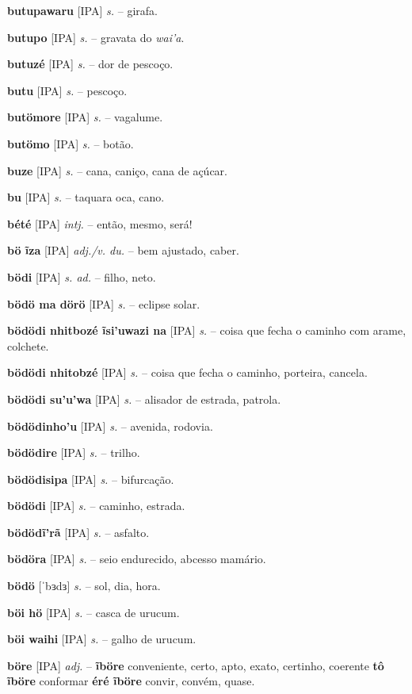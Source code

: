 \textbf{butupawaru} [IPA] \textit{s.} -- girafa.

\textbf{butupo} [IPA] \textit{s.} -- gravata do \textit{wai'a}.

\textbf{butuzé} [IPA] \textit{s.} -- dor de pescoço.

\textbf{butu} [IPA] \textit{s.} -- pescoço.

\textbf{butömore} [IPA] \textit{s.} -- vagalume.

\textbf{butömo} [IPA] \textit{s.} -- botão.

\textbf{buze} [IPA] \textit{s.} -- cana, caniço, cana de açúcar.

\textbf{bu} [IPA] \textit{s.} -- taquara oca, cano.

\textbf{bété} [IPA] \textit{intj.} -- então, mesmo, será!

\textbf{bö ĩza} [IPA] \textit{adj./v. du.} -- bem ajustado, caber.

\textbf{bödi} [IPA] \textit{s. ad.} -- filho, neto.

\textbf{bödö ma dörö} [IPA] \textit{s.} -- eclipse solar.

\textbf{bödödi nhitbozé ĩsi'uwazi na} [IPA] \textit{s.} -- coisa que fecha o caminho com arame, colchete.

\textbf{bödödi nhitobzé} [IPA] \textit{s.} -- coisa que fecha o caminho, porteira, cancela.

\textbf{bödödi su'u'wa} [IPA] \textit{s.} -- alisador de estrada, patrola.

\textbf{bödödinho'u} [IPA] \textit{s.} -- avenida, rodovia.

\textbf{bödödire} [IPA] \textit{s.} -- trilho.

\textbf{bödödisipa} [IPA] \textit{s.} -- bifurcação.

\textbf{bödödi} [IPA] \textit{s.} -- caminho, estrada.

\textbf{bödödĩ'rã} [IPA] \textit{s.} -- asfalto.

\textbf{bödöra} [IPA] \textit{s.} -- seio endurecido, abcesso mamário.

\textbf{bödö} [ˈbɜdɜ] \textit{s.} -- sol, dia, hora.

\textbf{böi hö} [IPA] \textit{s.} -- casca de urucum.

\textbf{böi waihi} [IPA] \textit{s.} -- galho de urucum.

\textbf{böre} [IPA] \textit{adj.} -- \textbf{ĩböre} conveniente, certo, apto, exato, certinho, coerente  \textbf{tô ĩböre} conformar  \textbf{éré ĩböre} convir, convém, quase.

